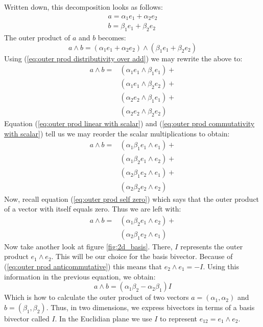\documentclass[10pt]{report}
\begin{document}
Written down, this decomposition looks as follows:
\begin{align}
    a = \alpha_{1}e_{1} + \alpha_{2}e_{2} \nonumber \\
    b = \beta_{1}e_{1}  + \beta_{2}e_{2}  \nonumber
\end{align}
The outer product of $a$ and $b$ becomes:
\begin{displaymath}
    a\wedge b = (\alpha_{1}e_{1} + \alpha_{2}e_{2})\wedge (\beta_{1}e_{1} + \beta_{2}e_{2})
\end{displaymath}
Using (\ref{eq:outer prod distributivity over add}) we may rewrite
the above to:
\begin{align}
    a\wedge b = &(\alpha_{1}e_{1}\wedge \beta_{1}e_{1}) + \nonumber\\
                &(\alpha_{1}e_{1}\wedge \beta_{2}e_{2}) + \nonumber\\
                &(\alpha_{2}e_{2}\wedge \beta_{1}e_{1}) + \nonumber\\
                &(\alpha_{2}e_{2}\wedge \beta_{2}e_{2})   \nonumber
\end{align}
Equation (\ref{eq:outer prod linear with scalar}) and
(\ref{eq:outer prod commutativity with scalar}) tell us we may
reorder the scalar multiplications to obtain:
\begin{align}
    a\wedge b = &(\alpha_{1}\beta_{1}e_{1}\wedge e_{1}) + \nonumber\\
                &(\alpha_{1}\beta_{2}e_{1}\wedge e_{2}) + \nonumber\\
                &(\alpha_{2}\beta_{1}e_{2}\wedge e_{1}) + \nonumber\\
                &(\alpha_{2}\beta_{2}e_{2}\wedge e_{2})   \nonumber
\end{align}
Now, recall equation (\ref{eq:outer prod self zero}) which says
that the outer product of a vector with itself equals zero. Thus
we are left with:
\begin{align}
    a\wedge b = &(\alpha_{1}\beta_{2}e_{1}\wedge e_{2}) + \nonumber\\
                &(\alpha_{2}\beta_{1}e_{2}\wedge e_{1})   \nonumber
\end{align}
Now take another look at figure \ref{fig:2d_basis}. There, $I$
represents the outer product $e_{1}\wedge e_{2}$. This will be our
choice for the basis bivector. Because of (\ref{eq:outer prod
anticommutative}) this means that $e_{2}\wedge e_{1} = -I$. Using
this information in the previous equation, we obtain:
\begin{equation}
    \label{eq:2d outer prod}
    a\wedge b = (\alpha_{1}\beta_{2} - \alpha_{2}\beta_{1})I
\end{equation}
Which is how to calculate the outer product of two vectors $a =
(\alpha_{1}, \alpha_{2})$ and $b = (\beta_{1}, \beta_{2})$. Thus,
in two dimensions, we express bivectors in terms of a basis
bivector called $I$. In the Euclidian plane we use $I$ to
represent $e_{12} = e_1 \wedge e_2$.
\end{document}

